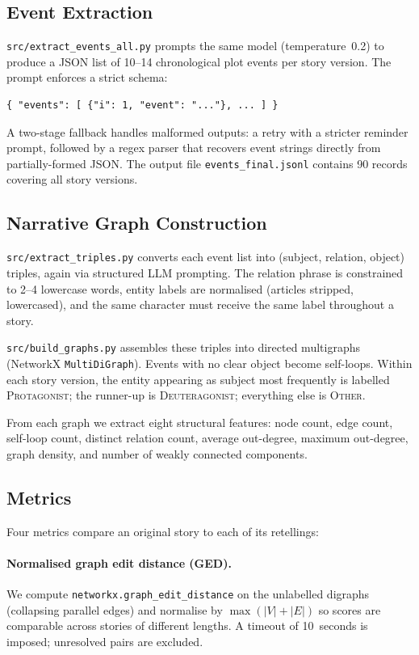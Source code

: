 \documentclass[11pt,a4paper]{article}
\begin{document}
\subsection{Event Extraction}

\texttt{src/extract\_events\_all.py} prompts the same model (temperature~0.2) to
produce a JSON list of 10--14 chronological plot events per story version.  The
prompt enforces a strict schema:

\begin{verbatim}
{ "events": [ {"i": 1, "event": "..."}, ... ] }
\end{verbatim}

A two-stage fallback handles malformed outputs: a retry with a stricter reminder
prompt, followed by a regex parser that recovers event strings directly from
partially-formed JSON.  The output file \texttt{events\_final.jsonl} contains 90
records covering all story versions.

\subsection{Narrative Graph Construction}

\texttt{src/extract\_triples.py} converts each event list into (subject,
relation, object) triples, again via structured LLM prompting.  The relation
phrase is constrained to 2--4 lowercase words, entity labels are normalised
(articles stripped, lowercased), and the same character must receive the same
label throughout a story.

\texttt{src/build\_graphs.py} assembles these triples into directed multigraphs
(NetworkX \texttt{MultiDiGraph}).  Events with no clear object become self-loops.
Within each story version, the entity appearing as subject most frequently is
labelled \textsc{Protagonist}; the runner-up is \textsc{Deuteragonist};
everything else is \textsc{Other}.

From each graph we extract eight structural features: node count, edge count,
self-loop count, distinct relation count, average out-degree, maximum out-degree,
graph density, and number of weakly connected components.

\subsection{Metrics}

Four metrics compare an original story to each of its retellings:

\paragraph{Normalised graph edit distance (GED).}
We compute \texttt{networkx.graph\_edit\_distance} on the unlabelled digraphs
(collapsing parallel edges) and normalise by
$\max(|V|+|E|)$ so scores are comparable across stories of different lengths.
A timeout of 10~seconds is imposed; unresolved pairs are excluded.
\end{document}
